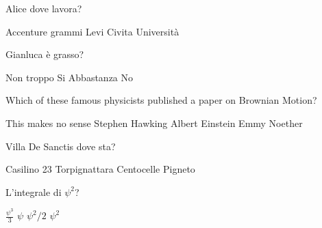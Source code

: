 \documentclass{exam}
\begin{document}
\begin{center}
\end{center}
\vspace{5mm}
\vspace{5mm}
\vspace{5mm}
\begin{questions}
\question[10] Alice dove lavora?
\begin{choices}
\choice Accenture
 grammi
\choice Levi Civita
\choice Università
\end{choices}
\question[10] Gianluca è grasso?
\begin{choices}
\choice Non troppo
\choice Si
\choice Abbastanza
\choice No
\end{choices}
\question[10] Which of these famous physicists published a paper on Brownian Motion?
\begin{choices}
\choice This makes no sense
\choice Stephen Hawking 
\choice Albert Einstein
\choice Emmy Noether
\end{choices}
\question[10] Villa De Sanctis dove sta?
\begin{choices}
\choice Casilino 23
\choice Torpignattara
\choice Centocelle
\choice Pigneto
\end{choices}
\question[10] L'integrale di $\psi^{2}$?
\begin{choices}
\choice $\frac{\psi^{3}}{3}$
\choice $\psi$
\choice $\psi^{2}/2$
\choice $\psi^{2}$
\end{choices}
\end{questions}
           
\end{document}
